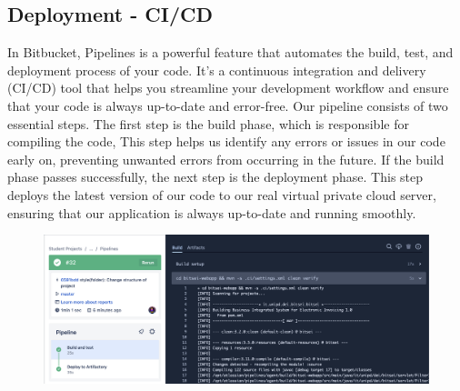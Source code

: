 \subsection{Deployment - CI/CD}\label{subsec:deployment---ci/cd}
In Bitbucket, Pipelines is a powerful feature that automates the build, test, and deployment process of your code.
It's a continuous integration and delivery (CI/CD) tool that helps you streamline your development workflow and ensure that your code is always up-to-date and error-free.
Our pipeline consists of two essential steps.
The first step is the build phase, which is responsible for compiling the code, This step helps us identify any errors or issues in our code early on, preventing unwanted errors from occurring in the future.
If the build phase passes successfully, the next step is the deployment phase.
This step deploys the latest version of our code to our real virtual private cloud server, ensuring that our application is always up-to-date and running smoothly.

\begin{figure}[h!]
    \centering
    \includegraphics[width=\textwidth, keepaspectratio]{resources/pipeline.png}\label{fig:bitbucket-pipeline}
\end{figure}